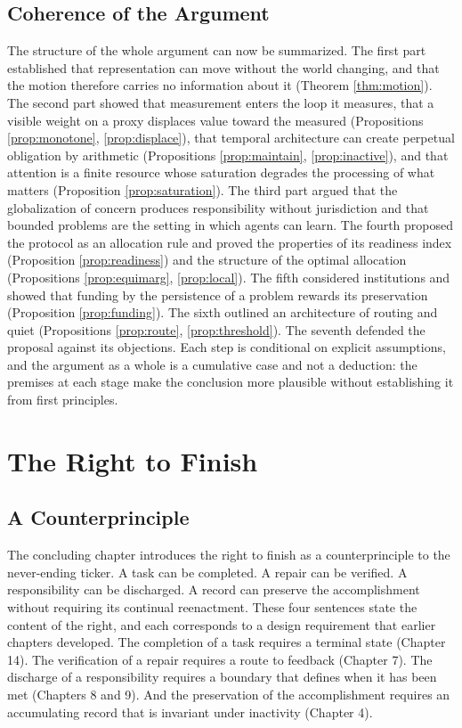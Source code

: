 \documentclass[11pt]{report}
\theoremstyle{definition}
\theoremstyle{remark}
\begin{document}
\section{Coherence of the Argument}

The structure of the whole argument can now be summarized. The first part established that representation can move without the world changing, and that the motion therefore carries no information about it (Theorem \ref{thm:motion}). The second part showed that measurement enters the loop it measures, that a visible weight on a proxy displaces value toward the measured (Propositions \ref{prop:monotone}, \ref{prop:displace}), that temporal architecture can create perpetual obligation by arithmetic (Propositions \ref{prop:maintain}, \ref{prop:inactive}), and that attention is a finite resource whose saturation degrades the processing of what matters (Proposition \ref{prop:saturation}). The third part argued that the globalization of concern produces responsibility without jurisdiction and that bounded problems are the setting in which agents can learn. The fourth proposed the protocol as an allocation rule and proved the properties of its readiness index (Proposition \ref{prop:readiness}) and the structure of the optimal allocation (Propositions \ref{prop:equimarg}, \ref{prop:local}). The fifth considered institutions and showed that funding by the persistence of a problem rewards its preservation (Proposition \ref{prop:funding}). The sixth outlined an architecture of routing and quiet (Propositions \ref{prop:route}, \ref{prop:threshold}). The seventh defended the proposal against its objections. Each step is conditional on explicit assumptions, and the argument as a whole is a cumulative case and not a deduction: the premises at each stage make the conclusion more plausible without establishing it from first principles.

\chapter{The Right to Finish}

\section{A Counterprinciple}

The concluding chapter introduces the right to finish as a counterprinciple to the never-ending ticker. A task can be completed. A repair can be verified. A responsibility can be discharged. A record can preserve the accomplishment without requiring its continual reenactment. These four sentences state the content of the right, and each corresponds to a design requirement that earlier chapters developed. The completion of a task requires a terminal state (Chapter 14). The verification of a repair requires a route to feedback (Chapter 7). The discharge of a responsibility requires a boundary that defines when it has been met (Chapters 8 and 9). And the preservation of the accomplishment requires an accumulating record that is invariant under inactivity (Chapter 4).
\end{document}
